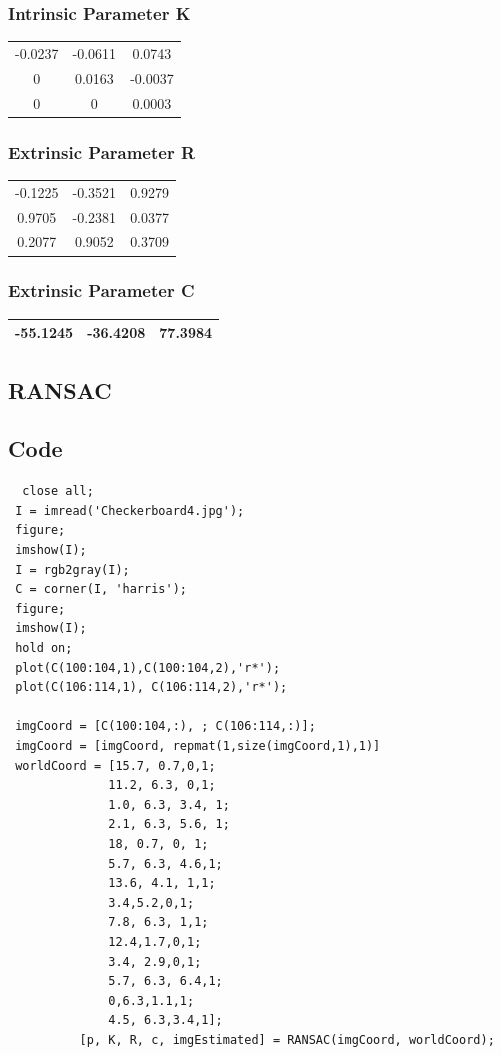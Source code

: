 \documentclass[12pt]{article}
\begin{document}
\subsubsection{Intrinsic Parameter K}
\begin{tabular}{|c|c|c|}
\hline
 -0.0237 &  -0.0611 &   0.0743 \\
         0   & 0.0163  &  -0.0037 \\
         0  &       0  &  0.0003\\
\hline
\end{tabular}

\subsubsection{Extrinsic Parameter R}
\begin{tabular}{|c|c|c|}
\hline
  -0.1225 & -0.3521 &   0.9279 \\
    0.9705 &  -0.2381  &  0.0377 \\
    0.2077 &   0.9052  &  0.3709\\
\hline
\end{tabular}

\subsubsection{Extrinsic Parameter C}
\begin{tabular}{|c|c|c|}
\hline
  -55.1245 &
  -36.4208 &
   77.3984 \\
 \hline
\end{tabular}

\subsection{RANSAC}
\subsection{Code}
\begin{lstlisting}
  close all;
 I = imread('Checkerboard4.jpg');
 figure;
 imshow(I);
 I = rgb2gray(I);
 C = corner(I, 'harris');
 figure;
 imshow(I);
 hold on;
 plot(C(100:104,1),C(100:104,2),'r*');
 plot(C(106:114,1), C(106:114,2),'r*');
 
 imgCoord = [C(100:104,:), ; C(106:114,:)];
 imgCoord = [imgCoord, repmat(1,size(imgCoord,1),1)]
 worldCoord = [15.7, 0.7,0,1;
              11.2, 6.3, 0,1;
              1.0, 6.3, 3.4, 1;
              2.1, 6.3, 5.6, 1;
              18, 0.7, 0, 1;
              5.7, 6.3, 4.6,1;
              13.6, 4.1, 1,1;
              3.4,5.2,0,1;
              7.8, 6.3, 1,1;
              12.4,1.7,0,1;
              3.4, 2.9,0,1;
              5.7, 6.3, 6.4,1;
              0,6.3,1.1,1;
              4.5, 6.3,3.4,1];
          [p, K, R, c, imgEstimated] = RANSAC(imgCoord, worldCoord);
      

\end{lstlisting}
\end{document}
